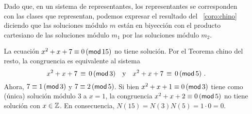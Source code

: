 \begin{obsChino}\label{obs:chino:coro}
	Dado que, en un sistema de representantes, los representantes se
	corresponden con las clases que representan, podemos expresar el
	resultado del \coroname~\ref{coro:chino} diciendo que
	las soluciones m\'odulo $m$ est\'an en biyecci\'on
	con el producto cartesiano de las soluciones m\'odulo $m_1$ por
	las soluciones m\'odulo $m_2$.
\end{obsChino}

\begin{ejemChino}\label{ejem:chino:polinomial:quince}
	La ecuaci\'on $x^2+x+7\equiv 0\tmodulo[15]$ no tiene soluci\'on.
	Por el Teorema chino del resto, la congruencia es equivalente al
	sistema
	\begin{displaymath}
		x^2+x+7\,\equiv\,0\tmodulo[3]\dispand
		x^2+x+7\,\equiv\,0\tmodulo[5]
		\dispstop
	\end{displaymath}
	Ahora, $7\equiv 1\tmodulo[3]$ y $7\equiv 2\tmodulo[5]$.
	Si bien $x^2+x+1\equiv 0\tmodulo[3]$ tiene como (\'unica)
	soluci\'on m\'odulo $3$ a $x=1$, la
	congruencia $x^2+x+2\equiv 0\tmodulo[5]$ no tiene soluci\'on
	con $x\in\Enteros$.
	En consecuencia, $N(15)=N(3)N(5)=1\cdot 0=0$.
\end{ejemChino}

